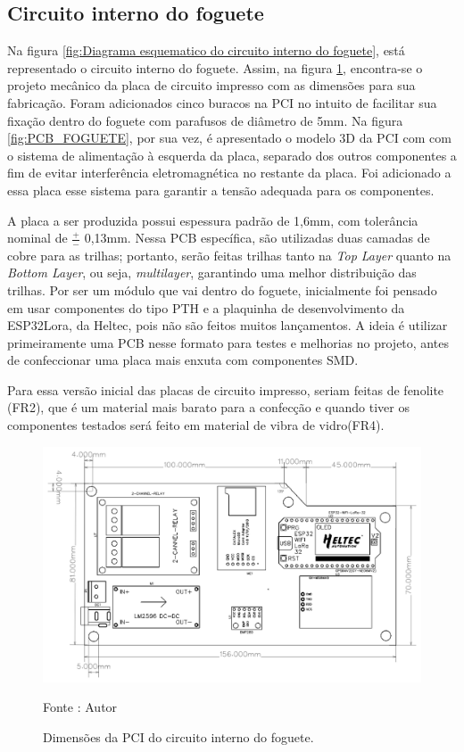 \subsection{Circuito interno do foguete}
\par Na figura \ref{fig:Diagrama esquematico do circuito interno do foguete}, está representado o circuito interno do foguete. Assim, na figura \ref{fig:PCIFOGUETE}, encontra-se o  projeto mecânico da placa de circuito impresso com as dimensões para sua fabricação. Foram adicionados cinco buracos na PCI no intuito de facilitar sua fixação dentro do foguete com parafusos de diâmetro de 5mm. Na figura \ref{fig:PCB_FOGUETE}, por sua vez, é apresentado o modelo 3D da PCI com com o sistema de alimentação à esquerda da placa, separado dos outros componentes a fim de evitar interferência eletromagnética no restante da placa. Foi adicionado a essa placa esse sistema para garantir a tensão adequada para os componentes. 
\par A placa a ser produzida possui espessura padrão de 1,6mm, com tolerância nominal de $\frac{+}{-}$ 0,13mm. Nessa PCB específica, são utilizadas duas camadas de cobre para as trilhas; portanto, serão feitas trilhas tanto na \textit{Top Layer} quanto na \textit{Bottom Layer}, ou seja, \textit{multilayer}, garantindo uma melhor distribuição das trilhas. Por ser um módulo que vai dentro do foguete, inicialmente foi pensado em usar componentes do tipo PTH e a plaquinha de desenvolvimento da ESP32Lora, da Heltec, pois não são feitos muitos lançamentos. A ideia é utilizar primeiramente uma PCB nesse formato para testes e melhorias no projeto, antes de confeccionar uma placa mais enxuta com componentes SMD. 
\par Para essa versão inicial das placas de circuito impresso, seriam feitas de fenolite (FR2), que é um material mais barato para a confecção e quando tiver os componentes testados será feito em material de vibra de vidro(FR4)\cite{CONCEITOpci}.

\begin{figure}[H]
  \centering
  \includegraphics[width=\textwidth]{figuras/PDFs/final eletronica/PCB_PCB_interna do foguete.png}
  \caption{Dimensões da PCI do circuito interno do foguete.} 
  {\footnotesize Fonte : Autor } 
  \label{fig:PCIFOGUETE}
\end{figure}

